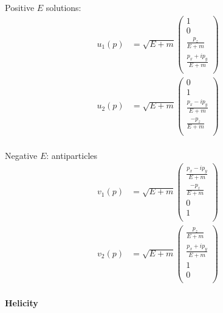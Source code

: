 \begin{multicols}{2}
    Positive $E$ solutions:
    \begin{align*}
        u_1(p) &= \sqrt{E+m}\begin{pmatrix}
            1 \\
            0 \\
            \frac{p_z}{E+m}\\
            \frac{p_x + ip_y}{E+m} \\
        \end{pmatrix}\\
        u_2(p) &= \sqrt{E+m}\begin{pmatrix}
            0 \\
            1 \\
            \frac{p_x - ip_y}{E+m} \\
            \frac{-p_z}{E+m}\\
        \end{pmatrix}\\
    \end{align*}
    
    Negative $E$: antiparticles
    \begin{align*}
        v_1(p) &= \sqrt{E+m}\begin{pmatrix}
            \frac{p_x - ip_y}{E+m} \\
            \frac{-p_z}{E+m}\\
            0 \\
            1 \\
        \end{pmatrix}\\
        v_2(p) &= \sqrt{E+m}\begin{pmatrix}
            \frac{p_z}{E+m}\\
            \frac{p_x + ip_y}{E+m} \\
            1 \\
            0 \\
        \end{pmatrix}\\
    \end{align*}
\end{multicols}
\textbf{Helicity}
